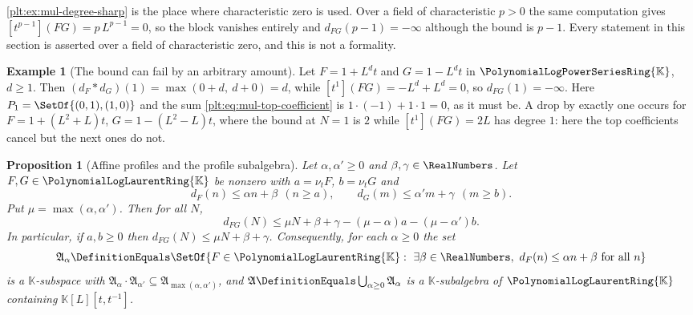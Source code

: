 \documentclass[11pt,oneside]{article}
\theoremstyle{plain}
\newtheorem{proposition}[theorem]{Proposition}
\theoremstyle{definition}
\newtheorem{example}[theorem]{Example}
\theoremstyle{remark}
\newcommand{\K}{\mathbb{K}}
\newcommand{\PLpow}{\PolynomialLogPowerSeriesRing{\K}}   %
\newcommand{\PLlau}{\PolynomialLogLaurentRing{\K}}       %
\newcommand{\ordt}{\nu_{t}}                              %
\newcommand{\dprofile}[1]{d_{#1}}                        %
\begin{document}
\begin{warningbox}
\cref{plt:ex:mul-degree-sharp} is the place where characteristic zero is
used.  Over a field of characteristic $p>0$ the same computation gives
$[t^{p-1}](FG)=p\,L^{p-1}=0$, so the block vanishes entirely and
$\dprofile{FG}(p-1)=-\infty$ although the bound is $p-1$.  Every statement in
this section is asserted over a field of characteristic zero, and this is not
a formality.
\end{warningbox}

\begin{example}[The bound can fail by an arbitrary amount]
\label{plt:ex:mul-degree-drop}
Let $F=1+L^{d}t$ and $G=1-L^{d}t$ in $\PLpow$, $d\ge1$.  Then
$(\dprofile{F}\ast\dprofile{G})(1)=\max(0+d,\ d+0)=d$, while
$[t^1](FG)=-L^{d}+L^{d}=0$, so $\dprofile{FG}(1)=-\infty$.  Here
$P_1=\SetOf{(0,1),(1,0)}$ and the sum
\eqref{plt:eq:mul-top-coefficient} is $1\cdot(-1)+1\cdot1=0$, as it must be.
A drop by exactly one occurs for $F=1+(L^2+L)t$, $G=1-(L^2-L)t$, where the
bound at $N=1$ is $2$ while $[t^1](FG)=2L$ has degree $1$: here the top
coefficients cancel but the next ones do not.
\end{example}

\begin{proposition}[Affine profiles and the profile subalgebra]
\label{plt:prop:mul-affine-profile}
Let $\alpha,\alpha'\ge0$ and $\beta,\gamma\in\RealNumbers$.  Let
$F,G\in\PLlau$ be nonzero with $a=\ordt F$, $b=\ordt G$ and
\[
 \dprofile{F}(n)\le\alpha n+\beta\ \ (n\ge a),
 \qquad
 \dprofile{G}(m)\le\alpha'm+\gamma\ \ (m\ge b).
\]
Put $\mu=\max(\alpha,\alpha')$.  Then for all $N$,
\begin{equation}\label{plt:eq:mul-affine-bound}
 \dprofile{FG}(N)\le\mu N+\beta+\gamma-(\mu-\alpha)a-(\mu-\alpha')b .
\end{equation}
In particular, if $a,b\ge0$ then $\dprofile{FG}(N)\le\mu N+\beta+\gamma$.
Consequently, for each $\alpha\ge0$ the set
\[
 \mathfrak A_\alpha
 \DefinitionEquals
 \SetOf{F\in\PLlau:\ \exists\beta\in\RealNumbers,\
        \dprofile{F}(n)\le\alpha n+\beta\ \text{for all }n}
\]
is a $\K$-subspace with
$\mathfrak A_\alpha\cdot\mathfrak A_{\alpha'}\subseteq
\mathfrak A_{\max(\alpha,\alpha')}$, and
$\mathfrak A\DefinitionEquals\bigcup_{\alpha\ge0}\mathfrak A_\alpha$ is a
$\K$-subalgebra of $\PLlau$ containing $\K[L][t,t^{-1}]$.
\end{proposition}
\end{document}
